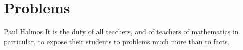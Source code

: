 \chapter{Problems}
\begin{boxQuote}{Paul Halmos}
It is the duty of all teachers, and of teachers of mathematics in particular, to expose their students to problems much more than to facts.
\end{boxQuote}

%








